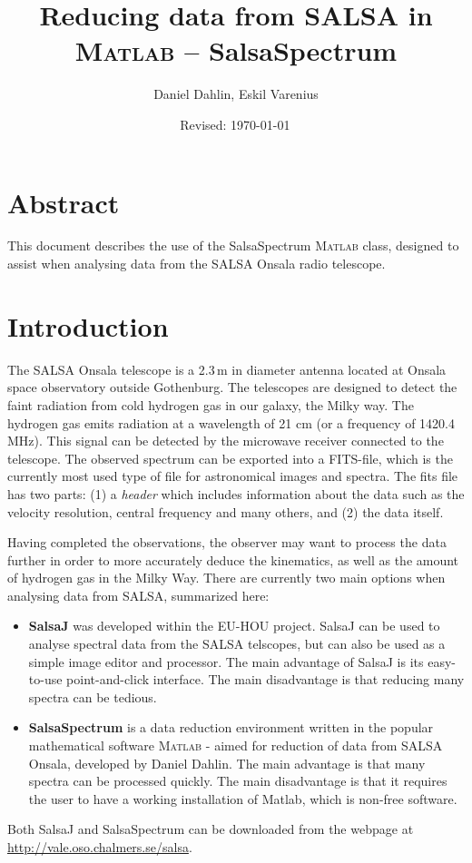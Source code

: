 \documentclass[11pt,a4paper]{article}
\begin{document}
\pagestyle{plain}
\title{\textsf{Reducing data from SALSA in \textsc{Matlab} -- {SalsaSpectrum}}}
\author{\textsf{Daniel Dahlin, Eskil Varenius}}
\yyyymmdddate
\date{\textsf{Revised: \today \, \currenttime}}
 

\maketitle

\section*{Abstract}
This document describes the use of the SalsaSpectrum \textsc{Matlab}
class, designed to assist when analysing data from the SALSA Onsala 
radio telescope. 

\tableofcontents

\section{Introduction}
\label{sec:introduction}

The SALSA Onsala telescope is a 2.3\,m in diameter antenna located at
Onsala space observatory outside Gothenburg. The telescopes are
designed to detect the faint radiation from cold hydrogen gas in our
galaxy, the Milky way. The hydrogen gas emits radiation at a
wavelength of 21 cm (or a frequency of 1420.4 MHz). This signal can be
detected by the microwave receiver connected to the telescope. 
The observed spectrum can be
exported into a FITS-file, which is the currently most used type of
file for astronomical images and spectra. The fits file has two parts:
(1) a \emph{header} which includes information
about the data such as the velocity resolution, central frequency and
many others, and (2) the data itself.

Having completed the observations, the observer may want to process
the data further in order to more accurately deduce the kinematics,
as well as the amount of hydrogen gas in the Milky Way. There are
currently two main options when analysing data from SALSA,
summarized here:

\begin{itemize}
\item \textbf{SalsaJ} was developed within the EU-HOU project.
	SalsaJ can be used to analyse spectral data from the SALSA telscopes, but
	can also be used as a simple image editor and processor.  The main
	advantage of SalsaJ is its easy-to-use point-and-click interface. The main
	disadvantage is that reducing many spectra can be tedious.
\item \textbf{SalsaSpectrum} is a data reduction environment written
  in the popular mathematical software \textsc{\textsc{Matlab}} -
  aimed for reduction of data from SALSA Onsala, developed by Daniel
  Dahlin. The main advantage is that many spectra can be processed
  quickly. The main disadvantage is that it requires the user to have
  a working installation of Matlab, which is non-free software.
\end{itemize}
Both SalsaJ and SalsaSpectrum can be downloaded from the webpage at
{\url{http://vale.oso.chalmers.se/salsa}}. 
\end{document}
